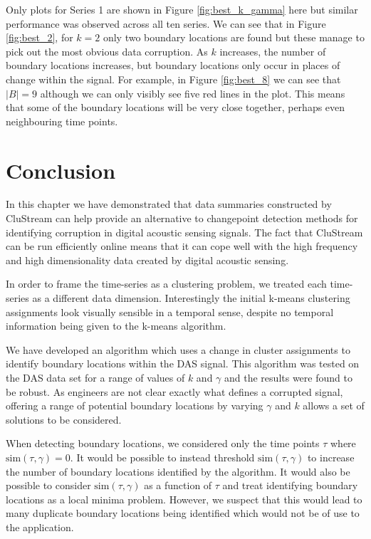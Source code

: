 Only plots for Series 1 are shown in Figure \ref{fig:best_k_gamma} here but similar performance was observed across all ten series.  We can see that in Figure \ref{fig:best_2}, for $k=2$ only two boundary locations are found but these manage to pick out the most obvious data corruption. As $k$ increases, the number of boundary locations increases, but boundary locations only occur in places of change within the signal. For example, in Figure \ref{fig:best_8} we can see that $|B| = 9$ although we can only visibly see five red lines in the plot. This means that some of the boundary locations will be very close together, perhaps even neighbouring time points. 


\section{Conclusion}
\label{sec:das_conc}

In this chapter we have demonstrated that data summaries constructed by CluStream can help provide an alternative to changepoint detection methods for identifying corruption in digital acoustic sensing signals. The fact that CluStream can be run efficiently online means that it can cope well with the high frequency and high dimensionality data created by digital acoustic sensing. 

In order to frame the time-series as a clustering problem, we treated each time-series as a different data dimension. Interestingly the initial k-means clustering assignments look visually sensible in a temporal sense, despite no temporal information being given to the k-means algorithm.

We have developed an algorithm which uses a change in cluster assignments to identify boundary locations within the DAS signal. This algorithm was tested on the DAS data set for a range of values of $k$ and $\gamma$ and the results were found to be robust. As engineers are not clear exactly what defines a corrupted signal, offering a range of potential boundary locations by varying $\gamma$ and $k$ allows a set of solutions to be considered. 

When detecting boundary locations, we considered only the time points $\tau$ where $\text{sim}(\tau, \gamma)=0$. It would be possible to instead threshold $\text{sim}(\tau, \gamma)$  to increase the number of boundary locations identified by the algorithm. It would  also be possible to consider  $\text{sim}(\tau, \gamma)$ as a function of $\tau$ and treat identifying boundary locations as a local minima problem. However, we suspect that this would lead to many duplicate boundary locations being identified which would not be of use to the application. 


